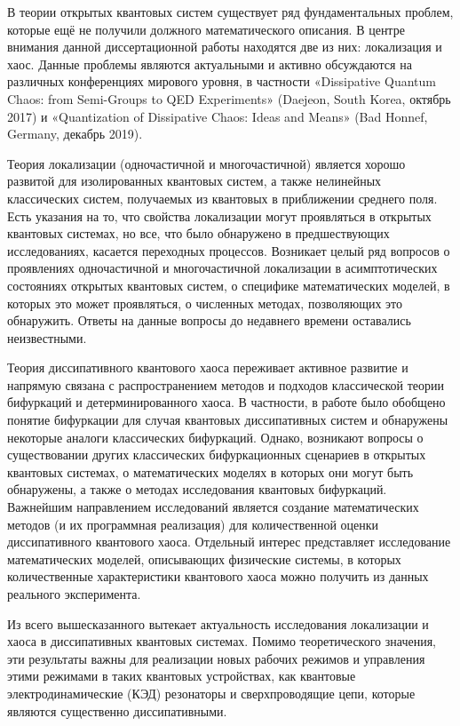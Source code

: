 В теории открытых квантовых систем существует ряд фундаментальных проблем, которые ещё не получили должного математического описания.
В центре внимания данной диссертационной работы находятся две из них: локализация и хаос.
Данные проблемы являются актуальными и активно обсуждаются на различных конференциях мирового уровня, в частности «Dissipative Quantum Chaos: from Semi-Groups to QED Experiments» (Daejeon, South Korea, октябрь 2017) и «Quantization of Dissipative Chaos: Ideas and Means» (Bad Honnef, Germany, декабрь 2019).

Теория локализации (одночастичной и многочастичной) является хорошо развитой для изолированных квантовых систем, а также нелинейных классических систем, получаемых из квантовых в приближении среднего поля.
Есть указания на то, что свойства локализации могут проявляться в открытых квантовых системах, но все, что было обнаружено в предшествующих исследованиях, касается переходных процессов\autocite{Genway2014}.
Возникает целый ряд вопросов о проявлениях одночастичной и многочастичной локализации в асимптотических состояниях открытых квантовых систем, о специфике математических моделей, в которых это может проявляться, о численных методах, позволяющих это обнаружить. 
Ответы на данные вопросы до недавнего времени оставались неизвестными.

Теория диссипативного квантового хаоса переживает активное развитие и напрямую связана с распространением методов и подходов классической теории бифуркаций и детерминированного хаоса.
В частности, в работе \autocite{Ivanchenko2017} было обобщено понятие бифуркации для случая квантовых диссипативных систем и обнаружены некоторые аналоги классических бифуркаций.
Однако, возникают вопросы о существовании других классических бифуркационных сценариев в открытых квантовых системах, о математических моделях в которых они могут быть обнаружены, а также о методах исследования квантовых бифуркаций.
Важнейшим направлением исследований является создание математических методов (и их программная реализация) для количественной оценки диссипативного квантового хаоса.
Отдельный интерес представляет исследование математических моделей, описывающих физические системы, в которых количественные характеристики квантового хаоса можно получить из данных реального эксперимента.

Из всего вышесказанного вытекает актуальность исследования локализации и хаоса в диссипативных квантовых системах. 
Помимо теоретического значения, эти результаты важны для реализации новых рабочих режимов и управления этими режимами в таких квантовых устройствах, как квантовые электродинамические (КЭД) резонаторы \autocite{Arakawa2015} и сверхпроводящие цепи, которые являются существенно диссипативными.

